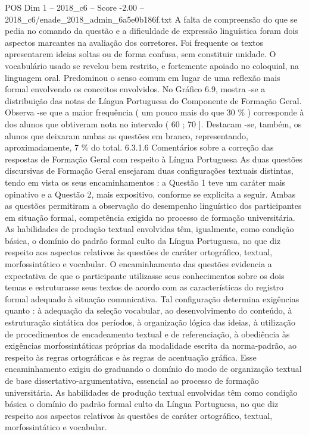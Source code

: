 \begin{textsample}{POS Dim 1 – 2018\_c6 – Score -2.00 – 2018\_c6/enade\_2018\_admin\_6a5e0b186f.txt}
A falta de compreensão do que se pedia no comando da questão e a dificuldade de expressão linguística foram dois aspectos marcantes na avaliação dos corretores.
Foi frequente os textos apresentarem ideias soltas ou de forma confusa, sem constituir unidade.
O vocabulário usado se revelou bem restrito, e fortemente apoiado no coloquial, na linguagem oral.
Predominou o senso comum em lugar de uma reflexão mais formal envolvendo os conceitos envolvidos.
No Gráfico 6.9, mostra -se a distribuição das notas de Língua Portuguesa do Componente de Formação Geral.
Observa -se que a maior frequência ( um pouco mais do que 30 \% ) corresponde à dos alunos que obtiveram nota no intervalo ( 60 ; 70 ].
Destacam -se, também, os alunos que deixaram ambas as questões em branco, representando, aproximadamente, 7 \% do total. 6.3.1.6 Comentários sobre a correção das respostas de Formação Geral com respeito à Língua Portuguesa As duas questões discursivas de Formação Geral ensejaram duas configurações textuais distintas, tendo em vista os seus encaminhamentos : a Questão 1 teve um caráter mais opinativo e a Questão 2, mais expositivo, conforme se explicita a seguir.
Ambas as questões permitiram a observação do desempenho linguístico dos participantes em situação formal, competência exigida no processo de formação universitária.
As habilidades de produção textual envolvidas têm, igualmente, como condição básica, o domínio do padrão formal culto da Língua Portuguesa, no que diz respeito aos aspectos relativos às questões de caráter ortográfico, textual, morfossintático e vocabular.
O encaminhamento das questões evidencia a expectativa de que o participante utilizasse seus conhecimentos sobre os dois temas e estruturasse seus textos de acordo com as características do registro formal adequado à situação comunicativa.
Tal configuração determina exigências quanto : à adequação da seleção vocabular, ao desenvolvimento do conteúdo, à estruturação sintática dos períodos, à organização lógica das ideias, à utilização de procedimentos de encadeamento textual e de referenciação, à obediência às exigências morfossintáticas próprias da modalidade escrita da norma-padrão, ao respeito às regras ortográficas e às regras de acentuação gráfica.
Esse encaminhamento exigiu do graduando o domínio do modo de organização textual de base dissertativo-argumentativa, essencial ao processo de formação universitária.
As habilidades de produção textual envolvidas têm como condição básica o domínio do padrão formal culto da Língua Portuguesa, no que diz respeito aos aspectos relativos às questões de caráter ortográfico, textual, morfossintático e vocabular.

\end{textsample}
